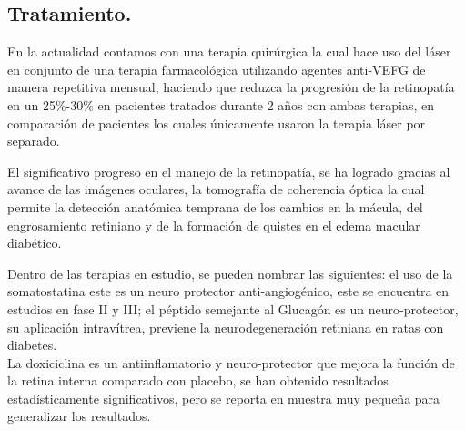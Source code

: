 \documentclass[12pt,letterpaper]{report}
\begin{document}
\pagebreak
\subsection{Tratamiento.}

En la actualidad contamos con una terapia quirúrgica la cual hace uso del láser en conjunto de una terapia farmacológica utilizando agentes anti-VEFG de manera repetitiva mensual, haciendo que reduzca la progresión de la retinopatía en un 25\%-30\% en pacientes tratados durante 2 años con ambas terapias, en comparación de pacientes los cuales únicamente usaron la terapia láser por separado.

El significativo progreso en el manejo de la retinopatía, se ha logrado gracias al avance de las imágenes oculares, la tomografía de coherencia óptica la cual permite la detección anatómica temprana de los cambios en la mácula, del engrosamiento retiniano y de la formación de quistes en el edema macular diabético.

Dentro de las terapias en estudio, se pueden nombrar las siguientes: el uso de la somatostatina este es un neuro protector anti-angiogénico, este se encuentra en estudios en fase II y III; el péptido semejante al Glucagón es un neuro-protector, su aplicación intravítrea, previene la neurodegeneración retiniana en ratas con diabetes.\\
\linebreak
La doxiciclina es un antiinflamatorio y neuro-protector que mejora la función de la retina interna comparado con placebo, se han obtenido resultados estadísticamente significativos, pero se reporta en muestra muy pequeña para generalizar los resultados.
\pagebreak
\end{document}
